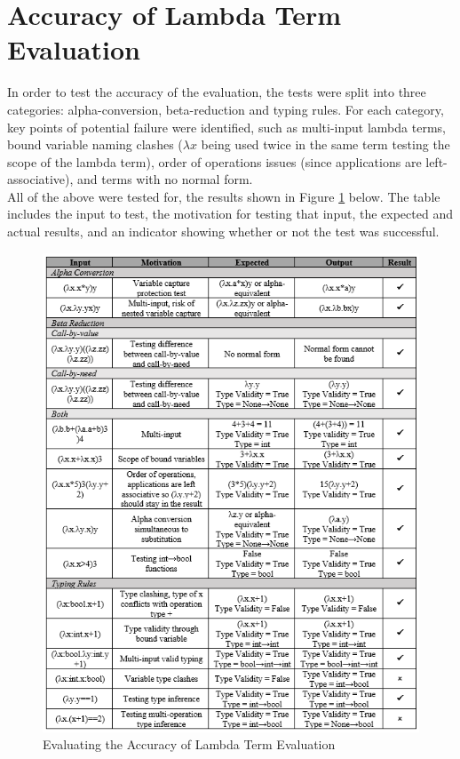 \documentclass[a4paper,12pt]{report}
\begin{document}
\section{Accuracy of Lambda Term Evaluation}
\label{Accuracy of Lambda Term Evaluation}
In order to test the accuracy of the evaluation, the tests were split into three categories: alpha-conversion, beta-reduction and typing rules. For each category, key points of potential failure were identified, such as multi-input lambda terms, bound variable naming clashes ($\lambda x$ being used twice in the same term testing the scope of the lambda term), order of operations issues (since applications are left-associative), and terms with no normal form.\\

All of the above were tested for, the results shown in Figure \ref{testing_log} below. The table includes the input to test, the motivation for testing that input, the expected and actual results, and an indicator showing whether or not the test was successful.

\begin{figure}[p]
	\includegraphics[scale=1.4]{images/Testing_Log}
	\centering
	\caption{Evaluating the Accuracy of Lambda Term Evaluation}
	\label{testing_log}
\end{figure}
\end{document}
